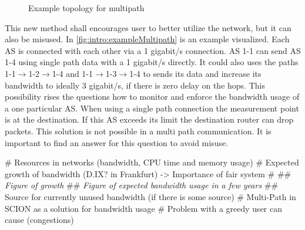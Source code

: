 \documentclass[thesis.tex]{subfiles}
\begin{document}
\begin{figure}[h]
    \centering
    \caption{Example topology for multipath}
    \label{fig:intro:exampleMultipath}
\end{figure}


This new method shall encourages user to better utilize the network, but it can also be misused. In \autoref{fig:intro:exampleMultipath} is an example visualized. Each AS is connected with each other via a 1 gigabit/s connection. AS 1-1 can send AS 1-4 using single path data with a 1 gigabit/s directly. It could also uses the paths 1-1$\rightarrow$1-2$\rightarrow$1-4 and 1-1$\rightarrow$1-3$\rightarrow$1-4 to sends its data and increase its bandwidth to ideally 3 gigabit/s, if there is zero delay on the hops. This possibility rises the questions how to monitor and enforce the bandwidth usage of a one particular AS. When using a single path connection the measurement point is at the destination. If this AS exceeds its limit the destination router can drop packets. This solution is not possible in a multi path communication. It is important to find an answer for this question to avoid misuse.

\begin{easylist}
    \MyListProperties
    # Resources in networks (bandwidth, CPU time and memory usage)
    # Expected growth of bandwidth (D.IX? in Frankfurt) -> Importance of fair system
    #
    ## \textit{Figure of growth}
    ## \textit{Figure of expected bandwidth usage in a few years}
    ## Source for currently unused bandwidth (if there is some source)
    # Multi-Path in SCION as a solution for bandwidth usage
    # Problem with a greedy user can cause (congestions)
\end{easylist}
\end{document}
